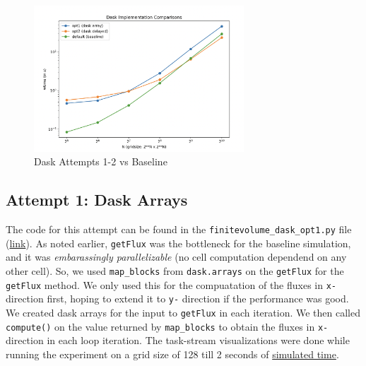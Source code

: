 \documentclass[a4paper,10pt]{article}
\begin{document}
\begin{figure}[h]
  \centering
  \includegraphics[width=0.7\textwidth]{images/dask/dask_comparison.png}
  \caption{Dask Attempts 1-2 vs Baseline}
  \label{fig:dask_attempts}
\end{figure}

\subsection{Attempt 1: Dask Arrays}
The code for this attempt can be found in the \verb|finitevolume_dask_opt1.py| file (\href{https://github.com/paulmyr/DD2358-HPC25/blob/master/10_project_rishi_paul/code/dask/finitevolume_dask_opt1.py}{link}). As noted earlier, \verb|getFlux| was the bottleneck for the baseline simulation, and it was \textit{embarassingly parallelizable} (no cell computation dependend on any other cell). So, we used \verb|map_blocks| from \verb|dask.arrays| on the \verb|getFlux| for the \verb|getFlux| method. We only used this for the compuatation of the fluxes in \verb|x-| direction first, hoping to extend it to \verb|y-| direction if the performance was good. We created dask arrays for the input to \verb|getFlux| in each iteration. We then called \verb|compute()| on the value returned by \verb|map_blocks| to obtain the fluxes in \verb|x-| direction in each loop iteration. The task-stream visualizations were done while running the experiment on a grid size of 128 till 2 seconds of \underline{simulated time}.
\end{document}
